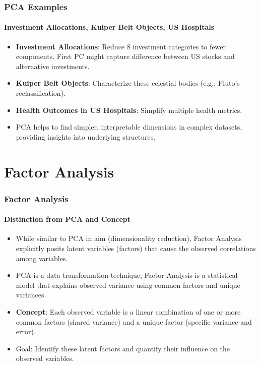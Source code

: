 \documentclass{beamer}
\begin{document}
\begin{frame}
    \frametitle{PCA Examples}
    \framesubtitle{Investment Allocations, Kuiper Belt Objects, US Hospitals}
    \begin{itemize}
        \item \textbf{Investment Allocations}: Reduce 8 investment categories to fewer components. First PC might capture difference between US stocks and alternative investments.
        \item \textbf{Kuiper Belt Objects}: Characterize these celestial bodies (e.g., Pluto's reclassification).
        \item \textbf{Health Outcomes in US Hospitals}: Simplify multiple health metrics.
        \item PCA helps to find simpler, interpretable dimensions in complex datasets, providing insights into underlying structures.
    \end{itemize}
\end{frame}

\section{Factor Analysis}

\begin{frame}
    \frametitle{Factor Analysis}
    \framesubtitle{Distinction from PCA and Concept}
    \begin{itemize}
        \item While similar to PCA in aim (dimensionality reduction), Factor Analysis explicitly posits \alert{latent variables} (factors) that cause the observed correlations among variables.
        \item PCA is a data transformation technique; Factor Analysis is a statistical model that explains observed variance using common factors and unique variances.
        \item \textbf{Concept}: Each observed variable is a linear combination of one or more common factors (shared variance) and a unique factor (specific variance and error).
        \item Goal: Identify these latent factors and quantify their influence on the observed variables.
    \end{itemize}
\end{frame}
\end{document}
